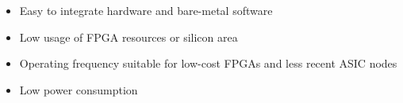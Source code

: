 \begin{itemize}
  \itemsep-0.5em
\item Easy to integrate hardware and bare-metal software
\item Low usage of FPGA resources or silicon area 
\item Operating frequency suitable for low-cost FPGAs and less recent ASIC nodes
\item Low power consumption
\end{itemize}
